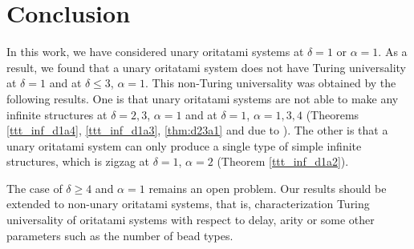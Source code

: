 \section{Conclusion}
In this work, we have considered unary oritatami systems at $\delta = 1$ or $\alpha = 1$.
%
As a result, we found that a unary oritatami system does not have Turing universality at $\delta = 1$ and at $\delta \leq 3$, $\alpha = 1$.
This non-Turing universality was obtained by the following results.
One is that unary oritatami systems are not able to make any infinite structures at $\delta = 2,3$, $\alpha = 1$ and at $\delta = 1$, $\alpha = 1,3,4$ (Theorems \ref{ttt_inf_d1a4}, \ref{ttt_inf_d1a3}, \ref{thm:d23a1} and due to \cite{DHOPRSST2018}).
The other is that a unary oritatami system can only produce a single type of simple infinite structures, which is zigzag at $\delta = 1$, $\alpha = 2$ (Theorem \ref{ttt_inf_d1a2}).

The case of $\delta \geq 4$ and $\alpha = 1$ remains an open problem.
Our results should be extended to non-unary oritatami systems, that is, characterization Turing universality of oritatami systems with respect to delay, arity or some other parameters such as the number of bead types.
